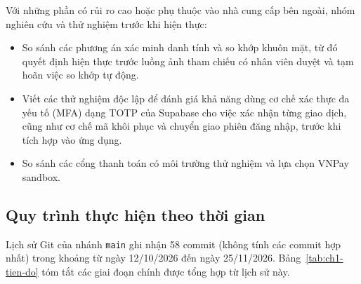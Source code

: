 Với những phần có rủi ro cao hoặc phụ thuộc vào nhà cung cấp bên ngoài, nhóm nghiên cứu và thử nghiệm trước khi hiện thực:
\begin{itemize}
	\item So sánh các phương án xác minh danh tính và so khớp khuôn mặt, từ đó quyết định hiện thực trước luồng ảnh tham chiếu có nhân viên duyệt và tạm hoãn việc so khớp tự động.
	\item Viết các thử nghiệm độc lập để đánh giá khả năng dùng cơ chế xác thực đa yếu tố (MFA) dạng TOTP của Supabase cho việc xác nhận từng giao dịch, cũng như cơ chế mã khôi phục và chuyển giao phiên đăng nhập, trước khi tích hợp vào ứng dụng.
	\item So sánh các cổng thanh toán có môi trường thử nghiệm và lựa chọn VNPay sandbox.
\end{itemize}

\subsection{Quy trình thực hiện theo thời gian}

Lịch sử Git của nhánh \texttt{main} ghi nhận 58 commit (không tính các commit hợp nhất) trong khoảng từ ngày 12/10/2026 đến ngày 25/11/2026. Bảng~\ref{tab:ch1-tien-do} tóm tắt các giai đoạn chính được tổng hợp từ lịch sử này.

